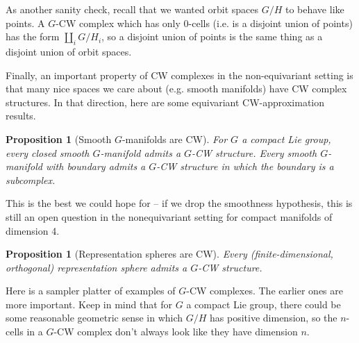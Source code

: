 \documentclass{amsart}
\newtheorem{prop}[thm]{Proposition}
\theoremstyle{definition}
\numberwithin{thm}{section}
\begin{document}
As another sanity check, recall that we wanted orbit spaces $G/H$ to behave like points. A $G$-CW complex which has only 0-cells (i.e. is a disjoint union of points) has the form $\coprod_i G/H_i$, so a disjoint union of points is the same thing as a disjoint union of orbit spaces. 

Finally, an important property of CW complexes in the non-equivariant setting is that many nice spaces we care about (e.g. smooth manifolds) have CW complex structures. In that direction, here are some equivariant CW-approximation results. 

\begin{prop}[Smooth $G$-manifolds are CW]
    For $G$ a compact Lie group, every closed smooth $G$-manifold admits a $G$-CW structure. Every smooth $G$-manifold with boundary admits a $G$-CW structure in which the boundary is a subcomplex.
\end{prop}

This is the best we could hope for -- if we drop the smoothness hypothesis, this is still an open question in the nonequivariant setting for compact manifolds of dimension 4.

\begin{prop}[Representation spheres are CW]
    Every (finite-dimensional, orthogonal) representation sphere admits a $G$-CW structure.
\end{prop}

Here is a sampler platter of examples of $G$-CW complexes. The earlier ones are more important. Keep in mind that for $G$ a compact Lie group, there could be some reasonable geometric sense in which $G/H$ has positive dimension, so the $n$-cells in a $G$-CW complex don't always look like they have dimension $n$. 
\end{document}
